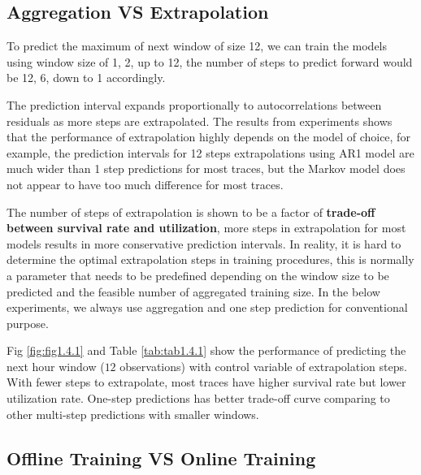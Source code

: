 \documentclass{article}
\begin{document}
\subsection{Aggregation VS Extrapolation}

\begin{flushleft}
To predict the maximum of next window of size 12, we can train the models using window size of 1, 2, up to 12, the number of steps to predict forward would be 12, 6, down to 1 accordingly.
\end{flushleft}

\begin{flushleft}
The prediction interval expands proportionally to autocorrelations between residuals as more steps are extrapolated. The results from experiments shows that the performance of extrapolation highly depends on the model of choice, for example, the prediction intervals for 12 steps extrapolations using AR1 model are much wider than 1 step predictions for most traces, but the Markov model does not appear to have too much difference for most traces.
\end{flushleft}

\begin{flushleft}
The number of steps of extrapolation is shown to be a factor of \textbf{trade-off between survival rate and utilization}, more steps in extrapolation for most models results in more conservative prediction intervals.
In reality, it is hard to determine the optimal extrapolation steps in training procedures, this is normally a parameter that needs to be predefined depending on the window size to be predicted and the feasible number of aggregated training size. In the below experiments, we always use aggregation and one step prediction for conventional purpose.
\end{flushleft}

\begin{flushleft}
Fig \ref{fig:fig1.4.1} and Table \ref{tab:tab1.4.1} show the performance of predicting the next hour window ($12$ observations) with control variable of extrapolation steps. With fewer steps to extrapolate, most traces have higher survival rate but lower utilization rate. One-step predictions has better trade-off curve comparing to other multi-step predictions with smaller windows.
\end{flushleft}

\subsection{Offline Training VS Online Training}
\end{document}
